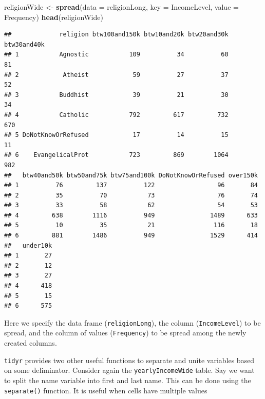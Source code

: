 \documentclass[]{article}
\newenvironment{Shaded}{\begin{snugshade}}{\end{snugshade}}
\newcommand{\KeywordTok}[1]{\textcolor[rgb]{0.13,0.29,0.53}{\textbf{#1}}}
\newcommand{\DataTypeTok}[1]{\textcolor[rgb]{0.13,0.29,0.53}{#1}}
\newcommand{\StringTok}[1]{\textcolor[rgb]{0.31,0.60,0.02}{#1}}
\newcommand{\NormalTok}[1]{#1}
\begin{document}
\begin{Shaded}
\begin{Highlighting}[]
\NormalTok{religionWide <-}\StringTok{ }\KeywordTok{spread}\NormalTok{(}\DataTypeTok{data =}\NormalTok{ religionLong, }\DataTypeTok{key =}\NormalTok{ IncomeLevel, }\DataTypeTok{value =}\NormalTok{ Frequency)}
\KeywordTok{head}\NormalTok{(religionWide)}
\end{Highlighting}
\end{Shaded}

\begin{verbatim}
##             religion btw100and150k btw10and20k btw20and30k btw30and40k
## 1           Agnostic           109          34          60          81
## 2            Atheist            59          27          37          52
## 3           Buddhist            39          21          30          34
## 4           Catholic           792         617         732         670
## 5 DoNotKnowOrRefused            17          14          15          11
## 6    EvangelicalProt           723         869        1064         982
##   btw40and50k btw50and75k btw75and100k DoNotKnowOrRefused over150k
## 1          76         137          122                 96       84
## 2          35          70           73                 76       74
## 3          33          58           62                 54       53
## 4         638        1116          949               1489      633
## 5          10          35           21                116       18
## 6         881        1486          949               1529      414
##   under10k
## 1       27
## 2       12
## 3       27
## 4      418
## 5       15
## 6      575
\end{verbatim}

Here we specify the data frame (\texttt{religionLong}), the column
(\texttt{IncomeLevel}) to be spread, and the column of values
(\texttt{Frequency}) to be spread among the newly created columns.

\texttt{tidyr} provides two other useful functions to separate and unite
variables based on some deliminator. Consider again the
\texttt{yearlyIncomeWide} table. Say we want to split the name variable
into first and last name. This can be done using the \texttt{separate()}
function. It is useful when cells have multiple values
\end{document}
